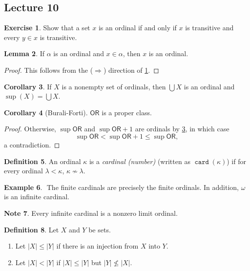 \documentclass[10pt,letterpaper,cm]{nupset}
\theoremstyle{definition}
\newtheorem{definition}{Definition}[subsection]
\newtheorem{exmp}[definition]{Example}
\newtheorem{note}[definition]{Note}
\theoremstyle{theorem}
\newtheorem{lemma}[definition]{Lemma}
\newtheorem{corollary}[definition]{Corollary}
\newtheorem{exercise}[definition]{Exercise}
\theoremstyle{remark}
\newcommand{\1}{\mathbf{1}}
\newcommand{\0}{\vec 0}
\newcommand{\ord}{\mathsf{OR}}
\DeclareMathOperator{\card}{\mathtt{card}}
\begin{document}
\subsection{Lecture 10}\label{Lecture10}


\begin{exercise}\label{ord-char}
Show that a set $x$ is an ordinal if and only if $x$ is transitive and every $y\in x$ is transitive. 
\end{exercise}

\begin{lemma}
If $\alpha$ is an ordinal and $x\in \alpha$, then $x$ is an ordinal. 
\end{lemma}
\begin{proof}
This follows from the ($\Longrightarrow$) direction of \cref{ord-char}.
\end{proof}

\begin{corollary}\label{LC}
If $X$ is a nonempty set of ordinals, then $\bigcup{X}$ is an ordinal and $\sup(X) = \bigcup{X}$.
\end{corollary}

\begin{corollary}[Burali-Forti]\label{B-F}
$\ord$ is a proper class.
\end{corollary}
\begin{proof}
Otherwise, $\sup{\ord}$ and $\sup{\ord}+1$ are ordinals by \cref{LC}, in which case $$\sup{\ord} < \sup{\ord} +1 \leq \sup{\ord},$$ a contradiction. 
 \end{proof}

\begin{definition}
 An ordinal $\kappa$ is a \textit{cardinal (number)} (written as $\card(\kappa)$) if for every ordinal $\lambda < \kappa$, $\kappa \not \sim \lambda$.
\end{definition}

\begin{exmp} $ $
The finite cardinals are precisely the finite ordinals. In addition, $\omega$ is an infinite cardinal.
\end{exmp}

\begin{note}
Every infinite cardinal is a nonzero limit ordinal. 
\end{note}

\begin{definition}
Let $X$ and $Y$ be sets. 
\begin{enumerate}
\item Let $\left\lvert{X}\right\rvert \leq \left\lvert{Y}\right\rvert$ if there is an injection from $X$ into $Y$. 
\item Let $\left\lvert{X}\right\rvert<\left\lvert{Y}\right\rvert$ if $\left\lvert{X}\right\rvert \leq \left\lvert{Y}\right\rvert$ but $\left\lvert{Y}\right\rvert \not \leq \left\lvert{X}\right\rvert$.
\end{enumerate}
\end{definition}
\end{document}
